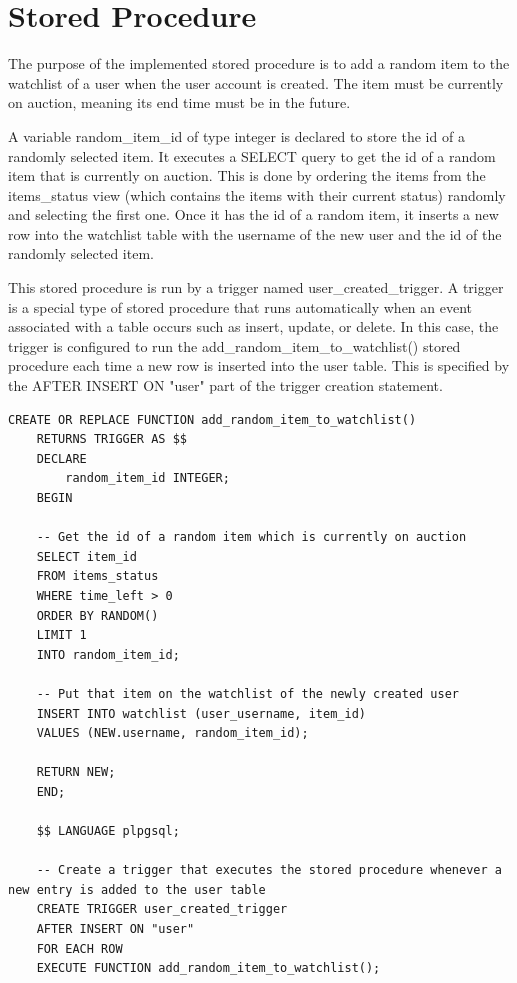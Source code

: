 \section{Stored Procedure}
The purpose of the implemented stored procedure is to add a random item to the watchlist of a user when the user account is created. The item must be currently on auction, meaning its end time must be in the future.

A variable random\_item\_id of type integer is declared to store the id of a randomly selected item. It executes a SELECT query to get the id of a random item that is currently on auction. This is done by ordering the items from the items\_status view (which contains the items with their current status) randomly and selecting the first one. Once it has the id of a random item, it inserts a new row into the watchlist table with the username of the new user and the id of the randomly selected item.

This stored procedure is run by a trigger named user\_created\_trigger. A trigger is a special type of stored procedure that runs automatically when an event associated with a table occurs such as insert, update, or delete. In this case, the trigger is configured to run the add\_random\_item\_to\_watchlist() stored procedure each time a new row is inserted into the user table. This is specified by the AFTER INSERT ON "user" part of the trigger creation statement.

\vspace{0.2cm}
\begin{lstlisting}[style=sqlStyle]
	CREATE OR REPLACE FUNCTION add_random_item_to_watchlist()
	RETURNS TRIGGER AS $$
	DECLARE
		random_item_id INTEGER;
	BEGIN
	
	-- Get the id of a random item which is currently on auction
	SELECT item_id
	FROM items_status
	WHERE time_left > 0
	ORDER BY RANDOM()
	LIMIT 1
	INTO random_item_id;
	
	-- Put that item on the watchlist of the newly created user
	INSERT INTO watchlist (user_username, item_id)
	VALUES (NEW.username, random_item_id);
	
	RETURN NEW;
	END;
	
	$$ LANGUAGE plpgsql;
	
	-- Create a trigger that executes the stored procedure whenever a new entry is added to the user table
	CREATE TRIGGER user_created_trigger
	AFTER INSERT ON "user"
	FOR EACH ROW
	EXECUTE FUNCTION add_random_item_to_watchlist();
\end{lstlisting}
